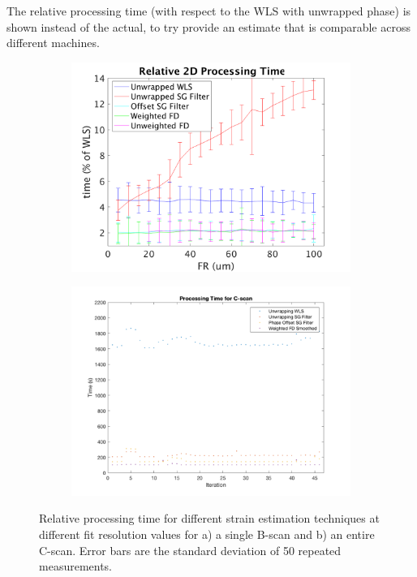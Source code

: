 The relative processing time (with respect to the WLS with unwrapped phase) is shown instead of the actual, to try provide an estimate that is comparable across different machines.

\begin{figure}[h!]
	\centering
    \begin{subfigure}{0.49\textwidth}
    	\centering
        \includegraphics[width=\textwidth]{figures/2d_relative_fr.png}
    \end{subfigure}
    \begin{subfigure}{0.49\textwidth}
    	\centering
        \includegraphics[width=\textwidth]{figures/3d_time_2.png}
    \end{subfigure}
    \caption{Relative processing time for different strain estimation techniques at different fit resolution values for a) a single B-scan and b) an entire C-scan. Error bars are the standard deviation of 50 repeated measurements.}
    \label{process_time_1}
\end{figure}


